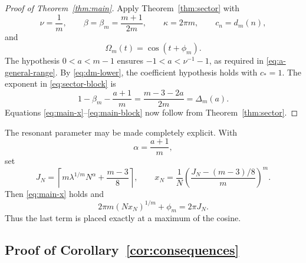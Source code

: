 \documentclass[11pt]{amsart}
\theoremstyle{plain}
\theoremstyle{definition}
\theoremstyle{remark}
\numberwithin{equation}{section}
\begin{document}
\begin{proof}[Proof of Theorem~\ref{thm:main}]
Apply Theorem~\ref{thm:sector} with
\[
  \nu=\frac1m,
  \qquad
  \beta=\beta_m=\frac{m+1}{2m},
  \qquad
  \kappa=2\pi m,
  \qquad
  c_n=d_m(n),
\]
and
\[
  \Omega_m(t)=\cos(t+\phi_m).
\]
The hypothesis $0<a<m-1$ ensures
$-1<a<\nu^{-1}-1$, as required in \eqref{eq:a-general-range}.  By \eqref{eq:dm-lower}, the coefficient hypothesis holds with $c_*=1$.  The exponent in \eqref{eq:sector-block} is
\[
  1-\beta_m-\frac{a+1}{m}
  =\frac{m-3-2a}{2m}
  =\Delta_m(a).
\]
Equations \eqref{eq:main-x}--\eqref{eq:main-block} now follow from Theorem~\ref{thm:sector}.
\end{proof}

The resonant parameter may be made completely explicit.  With
\[
  \alpha=\frac{a+1}{m},
\]
set
\begin{equation}\label{eq:explicit-x}
  J_N=
  \left\lceil
    m\lambda^{1/m}N^\alpha+\frac{m-3}{8}
  \right\rceil,
  \qquad
  x_N=\frac1N
  \left(\frac{J_N-(m-3)/8}{m}\right)^m.
\end{equation}
Then \eqref{eq:main-x} holds and
\begin{equation}\label{eq:exact-cosine-maximum}
  2\pi m(Nx_N)^{1/m}+\phi_m=2\pi J_N.
\end{equation}
Thus the last term is placed exactly at a maximum of the cosine.

\subsection{Proof of Corollary~\ref{cor:consequences}}
\end{document}
